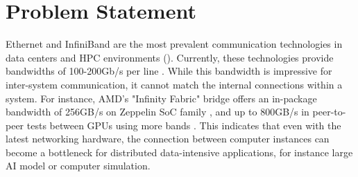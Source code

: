 \section{Problem Statement}\label{sec:introduction:problem_statement}
Ethernet and InfiniBand are the most prevalent communication technologies in data centers and \ac{HPC} environments (). 
Currently, these technologies provide bandwidths of 100-200Gb/s per line \cite{ethernet_roadmap}\cite{infiniband_roadmap}. 
While this bandwidth is impressive for inter-system communication, it cannot match the internal connections within a system. 
For instance, AMD's "Infinity Fabric" bridge offers an in-package bandwidth of 256GB/s on Zeppelin SoC family \cite{burd_zeppelin_2019}, and up to 800GB/s in peer-to-peer tests between GPUs using more bands \cite{amd_infinity_architecture}.
This indicates that even with the latest networking hardware, the connection between computer instances can become a bottleneck for distributed data-intensive applications, for instance large \ac{AI} model or computer simulation. 
